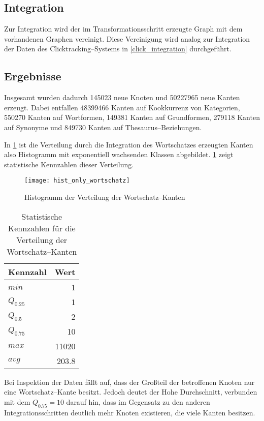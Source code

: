 \subsection{Integration}

Zur Integration wird der im Transformationsschritt erzeugte Graph mit dem vorhandenen Graphen vereinigt. Diese Vereinigung wird analog zur Integration der Daten des Clicktracking--Systems in \cref{click_integration} durchgeführt. 

\subsection{Ergebnisse}

Insgesamt wurden dadurch \num{145023} neue Knoten und \num{50227965} neue Kanten erzeugt.  Dabei entfallen \num{48399466} Kanten auf Kookkurrenz von Kategorien, \num{550270} Kanten auf Wortformen, \num{149381} Kanten auf Grundformen, \num{279118} Kanten auf Synonyme und \num{849730} Kanten auf Thesaurus--Beziehungen.

In \cref{fig:hist_only_wortschatz} ist die Verteilung durch die Integration des Wortschatzes erzeugten Kanten also Histogramm mit exponentiell wachsenden Klassen abgebildet. \cref{tab:only_wortschatz} zeigt statistische Kennzahlen dieser Verteilung.

\begin{figure}[h]
\centering
\texttt{[image: hist\_only\_wortschatz]}
\caption{Histogramm der Verteilung der Wortschatz--Kanten}
\label{fig:hist_only_wortschatz}
\end{figure}

\begin{table}[h]
\centering
\begin{tabular}{lr}
    \toprule
    Kennzahl & Wert \\
    \midrule
    \(min\) & \num{1} \\
    \(Q_{0.25}\) & \num{1} \\
    \(Q_{0.5}\) & \num{2} \\
    \(Q_{0.75}\) & \num{10} \\
    \(max\) &  \num{11020} \\
    \(avg\) &  \num{203,8} \\
    \bottomrule
\end{tabular}
\caption{Statistische Kennzahlen für die Verteilung der Wortschatz--Kanten}
\label{tab:only_wortschatz}
\end{table}

Bei Inspektion der Daten fällt auf, dass der Großteil der betroffenen Knoten nur eine Wortschatz--Kante besitzt. Jedoch deutet der Hohe Durchschnitt, verbunden mit dem \(Q_{0.75}=10\) darauf hin, dass im Gegensatz zu den anderen Integrationsschritten deutlich mehr Knoten existieren, die viele Kanten besitzen.

